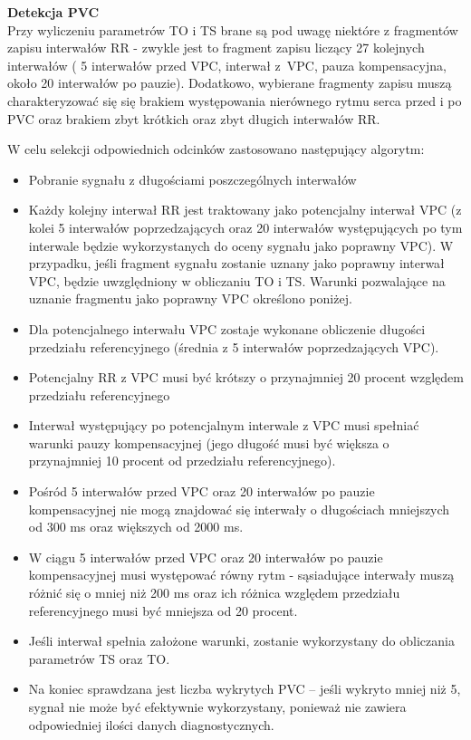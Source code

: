 \documentclass[a4paper, 11pt]{article}
\begin{document}
\textbf{Detekcja PVC}\\
Przy wyliczeniu parametrów TO i TS brane są pod uwagę niektóre z fragmentów zapisu interwałów RR - zwykle jest to fragment zapisu liczący 27 kolejnych 
interwałów ( 5 interwałów przed VPC, interwał z~VPC, pauza kompensacyjna,
około 20 interwałów po pauzie). Dodatkowo, wybierane fragmenty zapisu muszą  charakteryzować się się brakiem występowania nierównego rytmu serca przed i po PVC oraz brakiem zbyt krótkich oraz zbyt długich interwałów RR.
\par W celu selekcji odpowiednich odcinków zastosowano następujący algorytm:
\begin{itemize}
\item Pobranie sygnału z długościami poszczególnych interwałów
\item Każdy kolejny interwał RR jest traktowany jako
potencjalny interwał VPC (z kolei 5 interwałów poprzedzających oraz 20 interwałów występujących po tym interwale będzie wykorzystanych do oceny
sygnału jako poprawny VPC). 
W przypadku, jeśli fragment sygnału zostanie uznany jako poprawny
interwał VPC, będzie uwzględniony w obliczaniu TO i TS.
Warunki pozwalające na uznanie fragmentu jako poprawny VPC określono poniżej.
\item Dla potencjalnego interwału VPC zostaje wykonane obliczenie długości przedziału referencyjnego 
(średnia z  5 interwałów poprzedzających VPC).
\item Potencjalny RR z VPC musi być 
krótszy o przynajmniej 20 procent względem przedziału referencyjnego
\item Interwał występujący po potencjalnym interwale z VPC musi spełniać 
warunki pauzy kompensacyjnej (jego długość musi być większa o przynajmniej 10 procent od przedziału referencyjnego).
\item Pośród 5 interwałów przed VPC
oraz 20 interwałów po pauzie kompensacyjnej nie mogą znajdować się
interwały o długościach
mniejszych od 300 ms oraz większych od 2000 ms.
\item W ciągu 5 interwałów przed VPC
oraz 20 interwałów po pauzie kompensacyjnej musi występować
równy rytm - sąsiadujące interwały muszą różnić się o mniej
niż 200 ms oraz ich różnica względem przedziału referencyjnego musi być mniejsza
od 20 procent.
\item Jeśli interwał spełnia założone warunki, zostanie 
wykorzystany do obliczania parametrów TS oraz TO.
\item Na koniec sprawdzana jest liczba wykrytych 
PVC -- jeśli wykryto mniej niż 5, sygnał nie może być efektywnie 
wykorzystany, ponieważ nie zawiera odpowiedniej ilości
danych diagnostycznych. 
\end{itemize}
\end{document}
